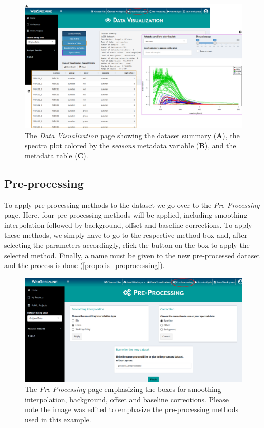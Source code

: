 \begin{figure}[h]
	\centering
	\includegraphics[width=1\linewidth]{Imagens/Propolis/data_overview}
	\caption{The \textit{Data Visualization} page showing the dataset summary (\textbf{A}), the spectra plot colored by the \textit{seasons} metadata variable (\textbf{B}), and the metadata table (\textbf{C}).}
	\label{propolis_data_overview}
\end{figure}


\subsection{Pre-processing}


To apply pre-processing methods to the dataset we go over to the \textit{Pre-Processing} page. Here, four pre-processing methods will be applied, including smoothing interpolation followed by background, offset and baseline corrections. To apply these methods, we simply have to go to the respective method box and, after selecting the parameters accordingly, click the button on the box to apply the selected method. Finally, a name must be given to the new pre-processed dataset and the process is done (\autoref{propolis_proprocessing}).

\begin{figure}[h]
	\centering
	\includegraphics[width=0.8\linewidth]{Imagens/Propolis/proprocessing}
	\caption{The \textit{Pre-Processing} page emphasizing the boxes for smoothing interpolation, background, offset and baseline corrections. Please note the image was edited to emphasize the pre-processing methods used in this example.}
	\label{propolis_proprocessing}
\end{figure}


